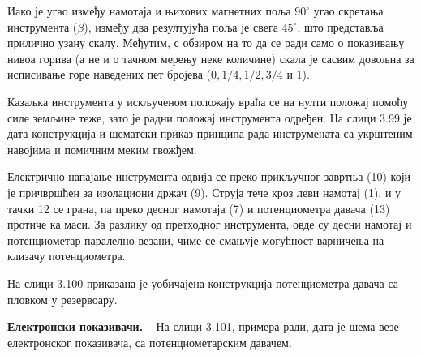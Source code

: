 \documentclass[12pt,a4paper]{report}
\begin{document}
Иако је угао између намотаја и њихових магнетних поља $90^\circ$ угао скретања инструмента ($\beta$), између два резултујућа поља је свега $45^\circ$, што представља прилично узану скалу. Међутим, с обзиром на то да се ради само о показивању нивоа горива (а не и о тачном мерењу неке количине) скала је сасвим довољна за исписивање горе наведених пет бројева ($0, 1/4, 1/2, 3/4$ и $1$).

Казаљка инструмента у искљученом положају враћа се на нулти положај помоћу силе земљине теже, зато је радни положај инструмента одређен.
На слици 3.99 је дата конструкција и шематски приказ принципа рада инструмената са укрштеним навојима и помичним меким гвожђем.


Електрично напајање инструмента одвија се преко прикључног завртња (10) који је причвршћен за изолациони држач (9). Струја тече кроз леви намотај (1), и у тачки 12 се грана, па преко десног намотаја (7) и потенциометра давача (13) протиче ка маси. За разлику од претходног инструмента, овде су десни намотај и потенциометар паралелно везани, чиме се смањује могућност варничења на клизачу потенциометра.

На слици 3.100 приказана је уобичајена конструкција потенциометра давача са пловком у резервоару.


\textbf{Електронски показивачи.} – На слици 3.101, примера ради, дата је шема везе електронског показивача, са потенциометарским давачем.
\end{document}
